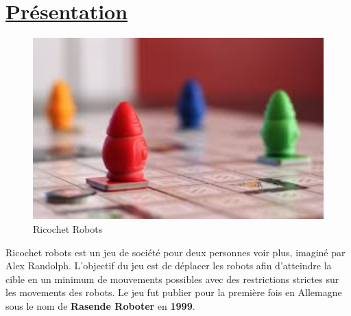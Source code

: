 \documentclass[12pt]{article}
\begin{document}
\section{\underline{Présentation}}
\begin{figure}[h!]
	\begin{center}
		\includegraphics[width=1\textwidth]{Images/plateau.jpeg}
	\end{center}
	\caption{Ricochet Robots}
	\label{plateau}
\end{figure}
	Ricochet robots est un jeu de société pour deux personnes voir plus, imaginé par Alex Randolph. L'objectif du jeu est de déplacer les robots afin d'atteindre la cible en un minimum
	de mouvements possibles avec des restrictions strictes sur les movements des robots. Le jeu fut publier pour la première fois en Allemagne sous le nom de \textbf{Rasende Roboter} en 
	\textbf{1999}.
	\newpage
\end{document}
